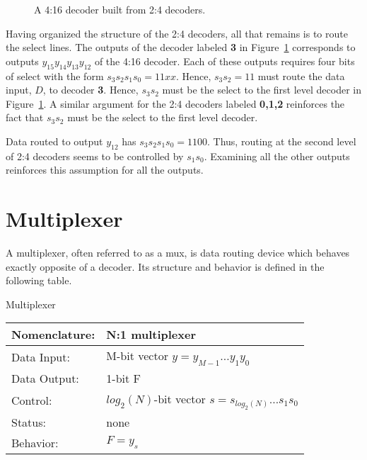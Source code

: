     \begin{figure}[ht]
        \caption{A 4:16 decoder built from 2:4 decoders.}
        \label{fig:comboBBBigDecoder}
    \end{figure}

    Having organized the structure of the 2:4 decoders, all that remains
    is to route the select lines.  The outputs of the decoder labeled
    \textbf{ 3} in Figure~\ref{fig:comboBBBigDecoder} corresponds to outputs
    $y_{15} y_{14} y_{13} y_{12}$
    of the 4:16 decoder.  Each of these outputs requires four bits of
    select with the form $s_3 s_2 s_1 s_0 = 11xx$.  Hence, $s_3 s_2 = 11$
    must route the data input, $D$, to decoder \textbf{ 3}.  Hence, $s_3 s_2$
    must be the select to the first level decoder in
    Figure~\ref{fig:comboBBBigDecoder}.   A similar argument for the 2:4 decoders
    labeled \textbf{ 0,1,2} reinforces the fact that $s_3 s_2$ must be the select
    to the first level decoder.

    Data routed to output $y_{12}$ has $s_3 s_2 s_1 s_0 = 1100$.  Thus, routing
    at the second level of 2:4 decoders seems to be controlled by $s_1 s_0$.
    Examining all the other outputs reinforces this assumption for all
    the outputs.

\section{Multiplexer}
A multiplexer, often referred to as a mux, is data routing device
which behaves exactly opposite of a decoder.  Its structure and
behavior is defined in the following table.

\begin{buildingblock}{Multiplexer}
    \label{buildingblock:multiplexer}
        \begin{tabular}{|l|p{3.5in}|} \hline
            Nomenclature:  & N:1 multiplexer                        \\ \hline
            Data Input:    & M-bit vector $y=y_{M-1} \ldots y_1 y_0$    \\ \hline
            Data Output:   & 1-bit F          \\ \hline
            Control:       & $log_2(N)$-bit vector $s = s_{log_2(N)} \ldots s_1 s_0$    \\ \hline
            Status:        & none                                   \\ \hline
            Behavior:      & $F = y_s$                \\ \hline
        \end{tabular}
        \label{page:mux}
    \end{buildingblock}

